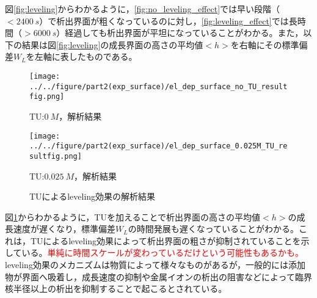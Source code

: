 \documentclass[autodetect-engine,dvi=dvipdfmx,a4paper,ja=standard,oneside,openany,11pt,draft]{bxjsbook}
\begin{document}
図\ref{fig:leveling}からわかるように，\ref{fig:no_leveling_effect}では早い段階（$<\SI{2400}{s}$）で析出界面が粗くなっているのに対し，\ref{fig:leveling_effect}では長時間（$>\SI{6000}{s}$）経過しても析出界面が平坦になっていることがわかる。また，以下の結果は図\ref{fig:leveling}の成長界面の高さの平均値$<h>$を右軸にその標準偏差$W_L$を左軸に表したものである。
\begin{figure}[H]
  \begin{minipage}
    {0.5\textwidth}
    \centering
    \texttt{[image: ../../figure/part2(exp\_surface)/el\_dep\_surface\_no\_TU\_resultfig.png]}
    \caption{TU:$\SI{0}{M}$，解析結果}
    \label{fig:no_leveling_effect_result}
  \end{minipage}
  \begin{minipage}
    {0.5\textwidth}
    \centering
    \texttt{[image: ../../figure/part2(exp\_surface)/el\_dep\_surface\_0.025M\_TU\_resultfig.png]}
    \caption{TU:$\SI{0.025}{M}$，解析結果}
    \label{fig:leveling_effect_result}
  \end{minipage}
  \caption{TUによるleveling効果の解析結果\cite{schilardi1998evolution}}
  \label{fig:leveling_result}
\end{figure}
図\ref{fig:leveling_result}からわかるように，TUを加えることで析出界面の高さの平均値$<h>$の成長速度が遅くなり，標準偏差$W_L$の時間発展も遅くなっていることがわかる。これは，TUによるleveling効果によって析出界面の粗さが抑制されていることを示している。\textcolor{red}{単純に時間スケールが変わっているだけという可能性もあるかも。}\\
leveling効果のメカニズムは物質によって様々なものがある\cite{めっき添加剤の作用機構と表面形状制御}が，一般的には添加物が界面へ吸着し，成長速度の抑制や金属イオンの析出の阻害などによって臨界核半径以上の析出を抑制することで起こるとされている\cite{oniciu1991some}。
\ifdraft{
  
  
}{}
\end{document}

